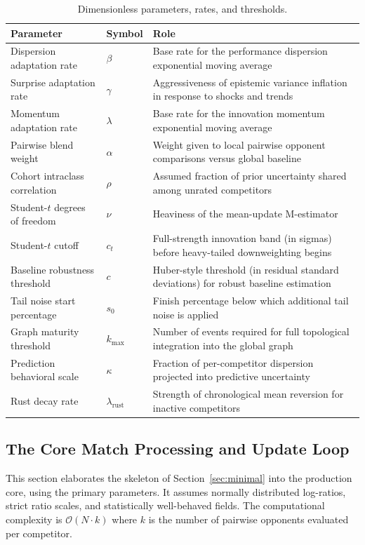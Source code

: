 \documentclass[12pt]{article}
\newcommand{\betad}{\beta}      %
\newcommand{\gammad}{\gamma}    %
\newcommand{\lambdad}{\lambda}  %
\newcommand{\alphad}{\alpha}    %
\newcommand{\rhoc}{\rho}        %
\newcommand{\nudof}{\nu}       %
\newcommand{\ctcut}{c_t}       %
\newcommand{\cthresh}{c}        %
\newcommand{\kmax}{k_{\mathrm{max}}}
\newcommand{\kappap}{\kappa}    %
\newcommand{\lambdar}{\lambda_{\mathrm{rust}}}
\begin{document}
	\begin{table}[htbp]
		\centering
		\caption{Dimensionless parameters, rates, and thresholds.}
		\label{tab:params-dimensionless}
		\begin{tabular}{llp{7cm}}
			\toprule
			\textbf{Parameter} & \textbf{Symbol} & \textbf{Role} \\
			\midrule
			Dispersion adaptation rate & \(\betad\) & Base rate for the performance dispersion exponential moving average \\
			Surprise adaptation rate & \(\gammad\) & Aggressiveness of epistemic variance inflation in response to shocks and trends \\
			Momentum adaptation rate & \(\lambdad\) & Base rate for the innovation momentum exponential moving average \\
			Pairwise blend weight & \(\alphad\) & Weight given to local pairwise opponent comparisons versus global baseline \\
			Cohort intraclass correlation & \(\rhoc\) & Assumed fraction of prior uncertainty shared among unrated competitors \\
			Student-$t$ degrees of freedom & \(\nudof\) & Heaviness of the mean-update M-estimator \\
			Student-$t$ cutoff & \(\ctcut\) & Full-strength innovation band (in sigmas) before heavy-tailed downweighting begins \\
			Baseline robustness threshold & \(\cthresh\) & Huber-style threshold (in residual standard deviations) for robust baseline estimation \\
			Tail noise start percentage & \(s_0\) & Finish percentage below which additional tail noise is applied \\
			Graph maturity threshold & \(\kmax\) & Number of events required for full topological integration into the global graph \\
			Prediction behavioral scale & \(\kappap\) & Fraction of per-competitor dispersion projected into predictive uncertainty \\
			Rust decay rate & \(\lambdar\) & Strength of chronological mean reversion for inactive competitors \\
			\bottomrule
		\end{tabular}
	\end{table}

	\subsection{The Core Match Processing and Update Loop}
	This section elaborates the skeleton of Section~\ref{sec:minimal} into the production core, using the primary parameters. It assumes normally distributed log-ratios, strict ratio scales, and statistically well-behaved fields. The computational complexity is $\mathcal{O}(N \cdot k)$ where $k$ is the number of pairwise opponents evaluated per competitor.
\end{document}
